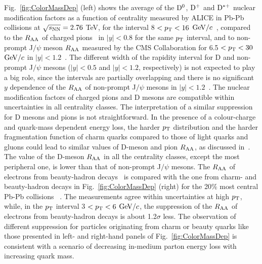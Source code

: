 Fig.~\ref{fig:ColorMassDep} (left) shows the average of the ${\rm D^0}$, ${\rm D^+}$ and ${\rm D^{*+}}$ 
nuclear modification factors as a function of centrality measured by ALICE in
Pb-Pb collisions at $\sqrt{s_{\rm NN}} =  2.76$ TeV, for the interval 8 $< p_{\rm T} < 16$ $\mathrm{GeV}/c$~\cite{Adam:2015nna}, 
compared to the $R_{\rm AA}$ of charged pions~\cite{Abelev:2014laa} in $|y| < 0.8$ for the same $p_{\rm T}$ interval, 
and to non-prompt J$/\psi$ meson $R_{\rm AA}$ measured by the CMS Collaboration for 6.5 $< p_{\rm T} < 30$ $\mathrm{GeV}/c$ 
in $|y| < 1.2$~\cite{Khachatryan:2016ypw}. The different width of the rapidity interval for D and non-prompt
J$/\psi$ mesons ($|y| < 0.5$ and $|y| < 1.2$, respectively) is not expected to play a big role, since
the intervals are partially overlapping and there is no significant $y$ dependence of the $R_{\rm AA}$ of 
non-prompt J$/\psi$ mesons in $|y| < 1.2$~\cite{Khachatryan:2016ypw}. The nuclear modification 
factors of charged pions and D mesons are compatible within uncertainties
in all centrality classes. The interpretation of a similar suppression for D mesons and pions is not
straightforward. In the presence of a colour-charge and quark-mass dependent 
energy loss, the harder $p_{\rm T}$ distribution and the harder fragmentation function of 
charm quarks compared to those of light quarks and gluons could lead to similar 
values of D-meson and pion $R_{\rm AA}$, as discussed in~\cite{Djordjevic:2013pba}. 
The value of the D-meson $R_{\rm AA}$ in all the centrality
classes, except the most peripheral one, is lower than that of non-prompt J$/\psi$ mesons. 
The $R_{\rm AA}$ of electrons from beauty-hadron decays~\cite{Adam:2016wyz} is compared with the one from charm- and
beauty-hadron decays in Fig.~\ref{fig:ColorMassDep} (right) for the 20\% most central Pb-Pb collisions
~\cite{Adam:2016khe}. The measurements agree within uncertainties at high $p_{\rm T}$, while, in the $p_{\rm T}$ 
interval 3 $< p_{\rm T} < 6$ $\mathrm{GeV}/c$, the suppression of the $R_{\rm AA}$ of electrons from beauty-hadron decays 
is about 1.2$\sigma$ less. The observation of different suppression for particles originating from
charm or beauty quarks like those presented in left- and right-hand panels of Fig.~\ref{fig:ColorMassDep} 
is consistent with a scenario of decreasing in-medium parton energy loss with increasing quark mass.

